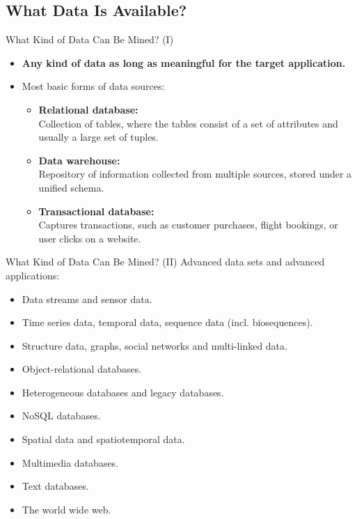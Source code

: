 \subsection{What Data Is Available?}

\begin{frame}{What Kind of Data Can Be Mined? (I)}
	\begin{itemize}
		\item \textbf{Any kind of data as long as meaningful for the target
			      application.}
		\item Most basic forms of data sources:
		      \begin{itemize}
			      \item \textbf{Relational database:} \\
			            \small{Collection of tables, where the tables consist of a
				            set of attributes and usually a large set of tuples.}
			      \item \textbf{Data warehouse:} \\
			            \small{Repository of information collected from multiple
				            sources, stored under a unified schema.}
			      \item \textbf{Transactional database:} \\
			            \small{Captures transactions, such as customer purchases,
				            flight bookings, or user clicks on a website.}
		      \end{itemize}
	\end{itemize}
\end{frame}
\begin{frame}{What Kind of Data Can Be Mined? (II)}
	Advanced data sets and advanced applications:
	\begin{itemize}
		\item Data streams and sensor data.
		\item Time series data, temporal data, sequence data (incl.
		      biosequences).
		\item Structure data, graphs, social networks and multi-linked data.
		\item Object-relational databases.
		\item Heterogeneous databases and legacy databases.
		\item NoSQL databases.
		\item Spatial data and spatiotemporal data.
		\item Multimedia databases.
		\item Text databases.
		\item The world wide web.
	\end{itemize}
\end{frame}
